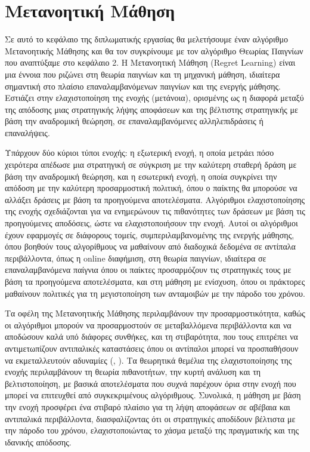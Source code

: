 \chapter{Μετανοητική Μάθηση}

Σε αυτό το κεφάλαιο της διπλωματικής εργασίας θα μελετήσουμε έναν αλγόριθμο Μετανοητικής Μάθησης και θα τον συγκρίνουμε με τον αλγόριθμο Θεωρίας Παιγνίων που αναπτύξαμε στο κεφάλαιο 2. Η Μετανοητική Μάθηση (Regret Learning) είναι μια έννοια που ριζώνει στη θεωρία παιγνίων και τη μηχανική μάθηση, ιδιαίτερα σημαντική στο πλαίσιο επαναλαμβανόμενων παιγνίων και της ενεργής μάθησης. Εστιάζει στην ελαχιστοποίηση της ενοχής (μετάνοια), ορισμένης ως η διαφορά μεταξύ της απόδοσης μιας στρατηγικής λήψης αποφάσεων και της βέλτιστης στρατηγικής με βάση την αναδρομική θεώρηση, σε επαναλαμβανόμενες αλληλεπιδράσεις ή επαναλήψεις. 

Υπάρχουν δύο κύριοι τύποι ενοχής: η εξωτερική ενοχή, η οποία μετράει πόσο χειρότερα απέδωσε μια στρατηγική σε σύγκριση με την καλύτερη σταθερή δράση με βάση την αναδρομική θεώρηση, και η εσωτερική ενοχή, η οποία συγκρίνει την απόδοση με την καλύτερη προσαρμοστική πολιτική, όπου ο παίκτης θα μπορούσε να αλλάξει δράσεις με βάση τα προηγούμενα αποτελέσματα. Αλγόριθμοι ελαχιστοποίησης της ενοχής σχεδιάζονται για να ενημερώνουν τις πιθανότητες των δράσεων με βάση τις προηγούμενες αποδόσεις, ώστε να ελαχιστοποιήσουν την ενοχή. Αυτοί οι αλγόριθμοι έχουν εφαρμογές σε διάφορους τομείς, συμπεριλαμβανομένης της ενεργής μάθησης, όπου βοηθούν τους αλγορίθμους να μαθαίνουν από διαδοχικά δεδομένα σε αντίπαλα περιβάλλοντα, όπως η online διαφήμιση, στη θεωρία παιγνίων, ιδιαίτερα σε επαναλαμβανόμενα παίγνια όπου οι παίκτες προσαρμόζουν τις στρατηγικές τους με βάση τα προηγούμενα αποτελέσματα, και στη μάθηση με ενίσχυση, όπου οι πράκτορες μαθαίνουν πολιτικές για τη μεγιστοποίηση των ανταμοιβών με την πάροδο του χρόνου. 

Τα οφέλη της Μετανοητικής Μάθησης περιλαμβάνουν την προσαρμοστικότητα, καθώς οι αλγόριθμοι μπορούν να προσαρμοστούν σε μεταβαλλόμενα περιβάλλοντα και να αποδώσουν καλά υπό διάφορες συνθήκες, και τη στιβαρότητα, που τους επιτρέπει να αντιμετωπίζουν αντιπαλικές καταστάσεις όπου οι αντίπαλοι μπορεί να προσπαθήσουν να εκμεταλλευτούν αδυναμίες (, ). Τα θεωρητικά θεμέλια της ελαχιστοποίησης της ενοχής περιλαμβάνουν τη θεωρία πιθανοτήτων, την κυρτή ανάλυση και τη βελτιστοποίηση, με βασικά αποτελέσματα που συχνά παρέχουν όρια στην ενοχή που μπορεί να επιτευχθεί από συγκεκριμένους αλγόριθμους. Συνολικά, η μάθηση με βάση την ενοχή προσφέρει ένα στιβαρό πλαίσιο για τη λήψη αποφάσεων σε αβέβαια και αντιπαλικά περιβάλλοντα, διασφαλίζοντας ότι οι στρατηγικές αποδίδουν βέλτιστα με την πάροδο του χρόνου, ελαχιστοποιώντας το χάσμα μεταξύ της πραγματικής και της ιδανικής απόδοσης.

